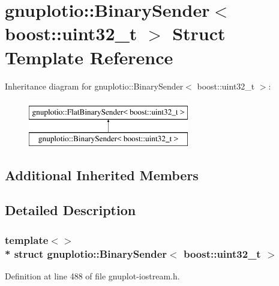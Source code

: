 \hypertarget{structgnuplotio_1_1_binary_sender_3_01boost_1_1uint32__t_01_4}{}\section{gnuplotio\+:\+:Binary\+Sender$<$ boost\+:\+:uint32\+\_\+t $>$ Struct Template Reference}
\label{structgnuplotio_1_1_binary_sender_3_01boost_1_1uint32__t_01_4}
Inheritance diagram for gnuplotio\+:\+:Binary\+Sender$<$ boost\+:\+:uint32\+\_\+t $>$\+:\begin{figure}[H]
\begin{center}
\leavevmode
\includegraphics[height=2.000000cm]{structgnuplotio_1_1_binary_sender_3_01boost_1_1uint32__t_01_4}
\end{center}
\end{figure}
\subsection*{Additional Inherited Members}


\subsection{Detailed Description}
\subsubsection*{template$<$$>$\\*
struct gnuplotio\+::\+Binary\+Sender$<$ boost\+::uint32\+\_\+t $>$}



Definition at line 488 of file gnuplot-\/iostream.\+h.

